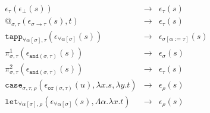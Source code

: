 \documentclass[runningheads,a4paper]{llncs}
\newcommand{\quant}[2]{\forall #1[#2]}
\newcommand{\qquant}[3]{#1 #2[#3]}
\newcommand{\red}{\longrightarrow}
\newcommand{\arrtype}{\rightarrow}
\newcommand{\abs}[2]{\lambda #1.#2}
\newcommand{\tabs}[2]{\Lambda #1.#2}
\begin{document}
\[
\begin{array}{rcl}
\epsilon_\tau(\epsilon_\bot(s)) & \red & \epsilon_\tau(s) \\
@_{\sigma,\tau}(\epsilon_{\sigma \arrtype \tau}(s),t) & \red &
  \epsilon_\tau(s) \\
\mathtt{tapp}_{\quant{\alpha}{\sigma},\tau}(
  \epsilon_{\quant{\alpha}{\sigma}}(s)) & \red &
  \epsilon_{\sigma[\alpha:=\tau]}(s) \\
\pi^1_{\sigma,\tau}(\epsilon_{\mathtt{and}(\sigma,\tau)}(s)) & \red &
  \epsilon_\sigma(s) \\
\pi^2_{\sigma,\tau}(\epsilon_{\mathtt{and}(\sigma,\tau)}(s)) & \red &
  \epsilon_\tau(s) \\
\mathtt{case}_{\sigma,\tau,\rho}(\epsilon_{\mathtt{or}(\sigma,\tau)}(
  u),\abs{x}{s},\abs{y}{t}) & \red & \epsilon_\rho(s) \\
\mathtt{let}_{\qquant{\forall}{\alpha}{\sigma},\rho}(\epsilon_{\qquant{
  \forall}{\alpha}{\sigma}}(s),\tabs{\alpha}{\abs{x}{t}}) & \red &
  \epsilon_\rho(s) \\
\end{array}
\]
\end{document}

